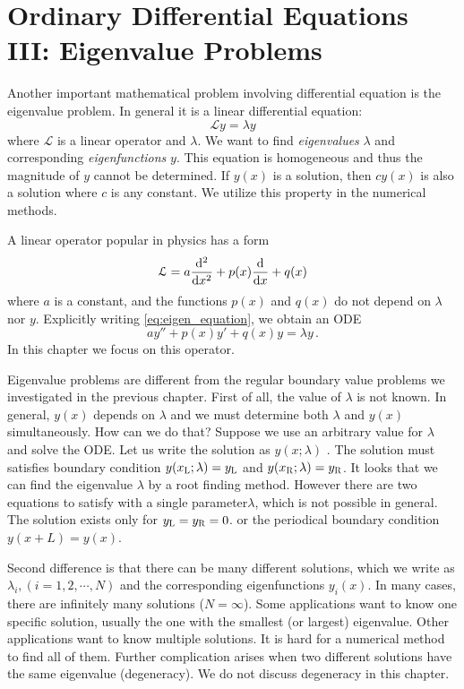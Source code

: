 \chapter{Ordinary Differential Equations III: Eigenvalue Problems}\label{ch:ode3}

Another important mathematical problem involving differential equation is the eigenvalue problem. In general it is a linear differential equation:
\begin{equation}\label{eq:eigen_equation}
\mathcal{L} y = \lambda y
\end{equation}
where $\mathcal{L}$ is a linear operator and $\lambda$.  We want to find \emph{eigenvalues} $\lambda$ and corresponding \emph{eigenfunctions} $y$. This equation is homogeneous and thus the magnitude of $y$ cannot be determined.  If $y(x)$ is a solution, then $c y(x)$ is also a solution where $c$ is any constant.  We utilize this property in the numerical methods.

A linear operator popular in physics has a form
\begin{equation}\label{eq:linear_operator}
\mathcal{L} = a \dv[2]{x} + p(x) \dv{x} + q(x)
\end{equation}
where $a$ is a constant, and the functions $p(x)$ and $q(x)$ do not depend on $\lambda$ nor $y$.   Explicitly writing \eqref{eq:eigen_equation}, we obtain an ODE
\begin{equation}
a y'' + p(x) y' + q(x) y = \lambda y\,.
\end{equation}
In this chapter we focus on this operator. 

Eigenvalue problems are different from the regular boundary value problems we investigated in the previous chapter. 
First of all, the value of $\lambda$ is not known. In general, $y(x)$ depends on $\lambda$ and we must determine both  $\lambda$ and $y(x)$ simultaneously.  How can we do that?  Suppose we use an arbitrary value for $\lambda$ and solve the ODE.  Let us write the solution as $y(x;\lambda)$ . The solution must satisfies boundary condition $y(x_\textsc{L};\lambda)=y_\textsc{L}$ and $y(x_\textsc{R};\lambda)=y_\textsc{R}$.  It looks that we can find the eigenvalue $\lambda$ by a root finding method.  However there are two equations to satisfy with a single parameter$\lambda$, which is not possible in general. The solution exists only for $y_\textsc{L}=y_\textsc{R}=0$.\cite{homogeneous_bvp1,homogeneous_bvp2} or the periodical boundary condition $y(x+L)=y(x)$.  

Second difference is that there can be many different solutions, which we write as
$\lambda_i, (i=1, 2, \cdots, N)$ and the corresponding eigenfunctions $y_i(x)$. In many cases, there are infinitely many solutions ($N=\infty$).
Some applications want to know one specific solution, usually the one with the smallest (or largest) eigenvalue.  Other applications want to know multiple solutions. It is hard for a numerical method to find all of them.  
Further complication arises when two different solutions have the same eigenvalue (degeneracy).  We do not discuss degeneracy in this chapter.

